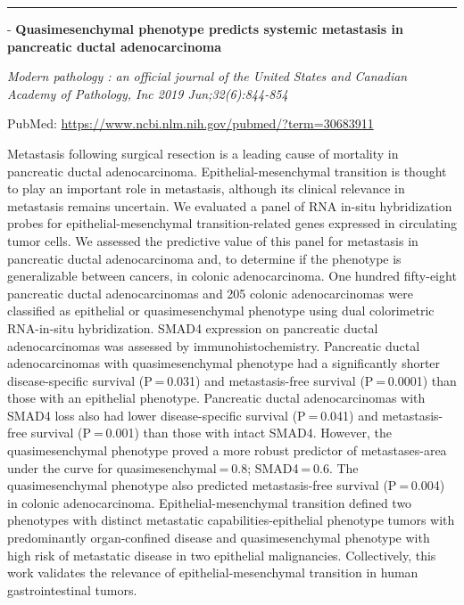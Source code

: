 \documentclass[]{article}
\begin{document}
{}

{}

\begin{center}\rule{0.5\linewidth}{\linethickness}\end{center}

 - \textbf{Quasimesenchymal phenotype predicts systemic metastasis in
pancreatic ductal adenocarcinoma}

\emph{Modern pathology : an official journal of the United States and
Canadian Academy of Pathology, Inc 2019 Jun;32(6):844-854}

PubMed: \url{https://www.ncbi.nlm.nih.gov/pubmed/?term=30683911}

Metastasis following surgical resection is a leading cause of mortality
in pancreatic ductal adenocarcinoma. Epithelial-mesenchymal transition
is thought to play an important role in metastasis, although its
clinical relevance in metastasis remains uncertain. We evaluated a panel
of RNA in-situ hybridization probes for epithelial-mesenchymal
transition-related genes expressed in circulating tumor cells. We
assessed the predictive value of this panel for metastasis in pancreatic
ductal adenocarcinoma and, to determine if the phenotype is
generalizable between cancers, in colonic adenocarcinoma. One hundred
fifty-eight pancreatic ductal adenocarcinomas and 205 colonic
adenocarcinomas were classified as epithelial or quasimesenchymal
phenotype using dual colorimetric RNA-in-situ hybridization. SMAD4
expression on pancreatic ductal adenocarcinomas was assessed by
immunohistochemistry. Pancreatic ductal adenocarcinomas with
quasimesenchymal phenotype had a significantly shorter disease-specific
survival (P = 0.031) and metastasis-free survival (P = 0.0001) than
those with an epithelial phenotype. Pancreatic ductal adenocarcinomas
with SMAD4 loss also had lower disease-specific survival (P = 0.041) and
metastasis-free survival (P = 0.001) than those with intact SMAD4.
However, the quasimesenchymal phenotype proved a more robust predictor
of metastases-area under the curve for quasimesenchymal = 0.8;
SMAD4 = 0.6. The quasimesenchymal phenotype also predicted
metastasis-free survival (P = 0.004) in colonic adenocarcinoma.
Epithelial-mesenchymal transition defined two phenotypes with distinct
metastatic capabilities-epithelial phenotype tumors with predominantly
organ-confined disease and quasimesenchymal phenotype with high risk of
metastatic disease in two epithelial malignancies. Collectively, this
work validates the relevance of epithelial-mesenchymal transition in
human gastrointestinal tumors.
\end{document}
